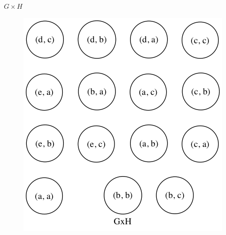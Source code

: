 \begin{enumerate}[(a)]
\begin{figure}[H]
    \end{figure}
    $G \times H$
    \begin{figure}[H]
    \centering
    \includegraphics[scale=0.5]{115/115bGH2.png}
    \end{figure}


\end{enumerate}
